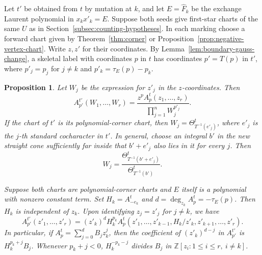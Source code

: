 \documentclass[11pt,reqno]{amsart}
\numberwithin{equation}{section}
\newtheorem{proposition}[theorem]{Proposition}
\theoremstyle{definition}
\theoremstyle{remark}
\begin{document}
Let \(t'\) be obtained from \(t\) by mutation at \(k\), and let
\(E=\widehat F_k\) be the exchange Laurent polynomial in \(x_kx'_k=E\).
Suppose both seeds give first-star charts of the same \(U\) as in
Section~\ref{subsec:counting-hypotheses}. In each marking choose a
forward chart given by Theorem~\ref{thm:corner} or
Proposition~\ref{prop:negative-vertex-chart}. Write \(z,z'\) for their
coordinates. By Lemma~\ref{lem:boundary-gauss-change}, a skeletal label
with coordinates \(p\) in \(t\) has coordinates \(p'=T(p)\) in \(t'\),
where \(p'_j=p_j\) for \(j\ne k\) and \(p'_k=\tau_E(p)-p_k\).

\begin{proposition}\label{prop:theta-factor-mutation}
Let \(W_j\) be the expression for \(z'_j\) in the \(z\)-coordinates.
Then
\[ A^{t'}_{p'}(W_1,\ldots,W_r)=\frac{z^p A_p^t(z_1,\ldots,z_r)}{\prod_{j=1}^n W_j^{p'_j}} . \]
If the chart of \(t'\) is its polynomial-corner chart, then
\(W_j=\Theta^t_{T^{-1}(e'_j)}\), where \(e'_j\) is the \(j\)-th
standard cocharacter in \(t'\). In general, choose an integral \(b'\)
in the new straight cone sufficiently far inside that \(b'+e'_j\) also
lies in it for every \(j\). Then
\[ W_j=\frac{\Theta^t_{T^{-1}(b'+e'_j)}}{\Theta^t_{T^{-1}(b')}} . \]

Suppose both charts are polynomial-corner charts and \(E\) itself is
a polynomial with nonzero constant term. Set \(H_k=A^t_{-e_k}\) and
\(d=\deg_{z_k} A^t_p=-\tau_E(p)\). Then \(H_k\) is independent of
\(z_k\). Upon identifying \(z_j=z'_j\) for \(j\ne k\), we have
\begin{equation}\label{eq:theta-factor-mutation}
A^{t'}_{p'}(z'_1,\ldots,z'_r)=(z'_k)^d H_k^{p_k}
   A^t_p(z'_1,\ldots,z'_{k-1},H_k/z'_k,z'_{k+1},\ldots,z'_r).
\end{equation}
In particular, if \(A^t_p=\sum_{j=0}^d B_j z_k^j\), then the
coefficient of \((z'_k)^{d-j}\) in \(A^{t'}_{p'}\) is
\(H_k^{p_k+j}B_j\). Whenever \(p_k+j<0\), \(H_k^{-p_k-j}\) divides
\(B_j\) in \(\mathbb Z[z_i:1\le i\le r,\ i\ne k]\).
\end{proposition}
\end{document}
